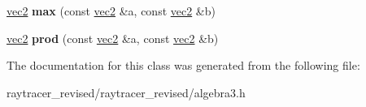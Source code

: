 \begin{DoxyCompactItemize}
\item 
\hypertarget{classvec2_af6e7013e8a5ea51023580cec96ea78fa}{
\hyperlink{classvec2}{vec2} {\bfseries max} (const \hyperlink{classvec2}{vec2} \&a, const \hyperlink{classvec2}{vec2} \&b)}
\label{classvec2_af6e7013e8a5ea51023580cec96ea78fa}

\item 
\hypertarget{classvec2_ab34a15f1b0458bd038c54775fe93dbf6}{
\hyperlink{classvec2}{vec2} {\bfseries prod} (const \hyperlink{classvec2}{vec2} \&a, const \hyperlink{classvec2}{vec2} \&b)}
\label{classvec2_ab34a15f1b0458bd038c54775fe93dbf6}

\end{DoxyCompactItemize}


The documentation for this class was generated from the following file:\begin{DoxyCompactItemize}
\item 
raytracer\_\-revised/raytracer\_\-revised/algebra3.h\end{DoxyCompactItemize}
